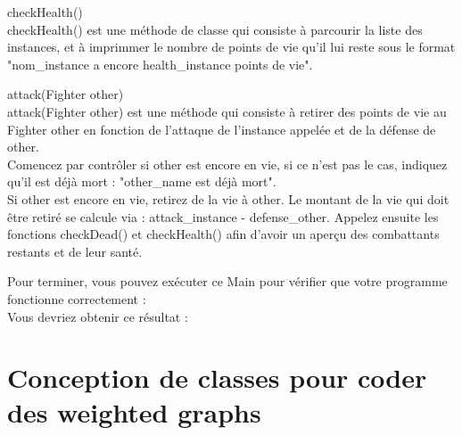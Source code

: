 \begin{Exercice} checkHealth()\\
    checkHealth() est une méthode de classe qui consiste à parcourir la liste des instances, et à imprimmer le nombre de points de vie qu'il lui reste sous le format "nom\_instance a encore health\_instance points de vie". 

\begin{solution}
	
\end{solution}
\end{Exercice}

\begin{Exercice} attack(Fighter other)\\
    attack(Fighter other) est une méthode qui consiste à retirer des points de vie au Fighter other en fonction de l'attaque de l'instance appelée et de la défense de other. \\
    
    Comencez par contrôler si other est encore en vie, si ce n'est pas le cas, indiquez qu'il est déjà mort : "other\_name est déjà mort". \\
    
     Si other est encore en vie, retirez de la vie à other. Le montant de la vie qui doit être retiré se calcule via : attack\_instance - defense\_other. Appelez ensuite les fonctions checkDead() et checkHealth() afin d'avoir un aperçu des combattants restants et de leur santé.
    


\begin{solution}
	
\end{solution}
\end{Exercice}


Pour terminer, vous pouvez exécuter ce Main pour vérifier que votre programme fonctionne correctement : \\



Vous devriez obtenir ce résultat : \\




\section{Conception de classes pour coder des weighted graphs}

